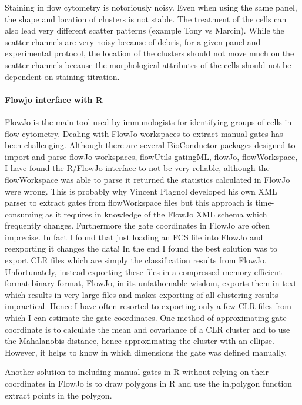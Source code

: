 Staining in flow cytometry is notoriously noisy.  Even when using the same panel, the shape and location of clusters is not stable.
The treatment of the cells can also lead very different scatter patterns (example Tony vs Marcin).
While the scatter channels are very noisy because of debris, for a given panel and experimental protocol, the location of the clusters should not move much on the scatter channels because the morphological attributes of the cells should not be dependent on staining titration.


\paragraph{ Flowjo interface with R}

FlowJo is the main tool used by immunologists for identifying groups of cells in flow cytometry.
Dealing with FlowJo workspaces to extract manual gates has been challenging.
Although there are several BioConductor packages designed to import and parse flowJo workspaces, flowUtils gatingML, flowJo, flowWorkspace,
I have found the R/FlowJo interface to not be very reliable, although the flowWorkspace was able to parse it returned the statistics calculated in FlowJo were wrong.
This is probably why Vincent Plagnol developed his own XML parser to extract gates from flowWorkspace files but this approach is time-consuming as it requires in knowledge of the FlowJo XML schema which frequently changes.
Furthermore the gate coordinates in FlowJo are often imprecise.
In fact I found that just loading an FCS file into FlowJo and reexporting it changes the data!
In the end I found the best solution was to export CLR files which are simply the classification results from FlowJo.
Unfortunately, instead exporting these files in a compressed memory-efficient format binary format, FlowJo, in its unfathomable wisdom, exports them in text which results in very large files and makes exporting of all clustering results impractical.
Hence I have often resorted to exporting only a few CLR files from which I can estimate the gate coordinates.
One method of approximating gate coordinate is to calculate the mean and covariance of a CLR cluster and to use the Mahalanobis distance,
hence approximating the cluster with an ellipse.
However, it helps to know in which dimensions the gate was defined manually.

Another solution to including manual gates in R without relying on their coordinates in FlowJo
is to draw polygons in R and use the in.polygon function extract points in the polygon.


